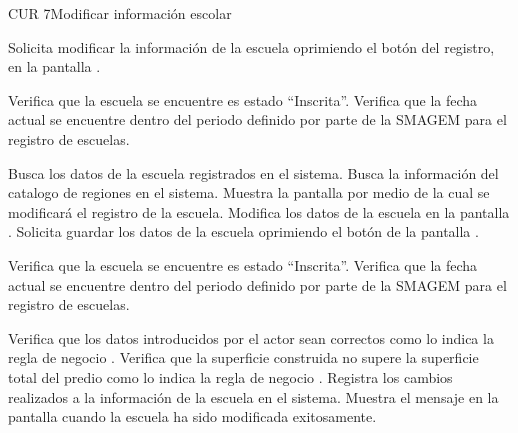 \begin{UseCase}{CUR 7}{Modificar información escolar}
{\begin{UClist}
      \end{UClist}
    }
  \end{UseCase}

 \begin{UCtrayectoria}
    \UCpaso[\UCactor] Solicita modificar la información de la escuela oprimiendo el botón \botEdit del registro, en la pantalla .

    \UCpaso[\UCsist] Verifica que la escuela se encuentre es estado ``Inscrita''. 
    \UCpaso[\UCsist] Verifica que la fecha actual se encuentre dentro del periodo definido por parte de la SMAGEM para el registro de escuelas. 

    \UCpaso[\UCsist] Busca los datos de la escuela registrados en el sistema.
    \UCpaso[\UCsist] Busca la información del catalogo de regiones en el sistema. 
    \UCpaso[\UCsist] Muestra la pantalla  por medio de la cual se modificará el registro de la escuela.
    \UCpaso[\UCactor] Modifica los datos de la escuela en la pantalla . \label{cur7:Acciones}
    \UCpaso[\UCactor] Solicita guardar los datos de la escuela oprimiendo el botón  de la pantalla . 
    
    \UCpaso[\UCsist] Verifica que la escuela se encuentre es estado ``Inscrita''. 
    \UCpaso[\UCsist] Verifica que la fecha actual se encuentre dentro del periodo definido por parte de la SMAGEM para el registro de escuelas. 
        
    \UCpaso[\UCsist] Verifica que los datos introducidos por el actor sean correctos como lo indica la regla de negocio .    
    \UCpaso[\UCsist] Verifica que la superficie construida no supere la superficie total del predio como lo indica la regla de negocio . 
    \UCpaso[\UCsist] Registra los cambios realizados a la información de la escuela en el sistema.\label{cur7:termina}
    \UCpaso[\UCsist] Muestra el mensaje  en la pantalla  cuando la escuela ha sido modificada exitosamente.
 \end{UCtrayectoria}

